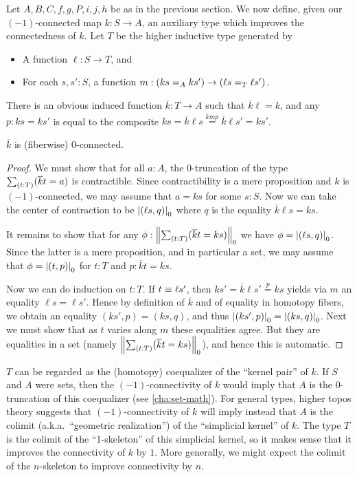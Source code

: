 Let $A,B,C,f,g,P,i,j,h$ be as in the previous section.
We now define, given our $(-1)$-connected map $k:S\to A$, an auxiliary type which improves the connectedness of $k$.
Let $T$ be the higher inductive type generated by
\begin{itemize}
\item A function $\ell:S\to T$, and
\item For each $s,s':S$, a function $m:(\id[A]{ks}{ks'}) \to (\id[T]{\ell s}{\ell s'})$.
\end{itemize}
\newcommand{\kbar}{\overline{k}}
There is an obvious induced function $\kbar:T\to A$ such that $\kbar \ell = k$, and any $p:ks=ks'$ is equal to the composite $ks = \kbar \ell s \overset{\kbar m p}{=} \kbar \ell s' = k s'$.

\begin{lem}\label{thm:kbar}
  $\kbar$ is (fiberwise) 0-connected.
\end{lem}
\begin{proof}
  We must show that for all $a:A$, the 0-truncation of the type $\sm{t:T}(\kbar t = a)$ is contractible.
  Since contractibility is a mere proposition and $k$ is $(-1)$-connected, we may assume that $a=ks$ for some $s:S$.
  Now we can take the center of contraction to be $\tproj0{(\ell s,q)}$ where $q$ is the equality $\kbar\ell s = k s$.

  It remains to show that for any $\phi:\trunc0{\sm{t:T} (\kbar t = ks)}$ we have $\phi = \tproj0{(\ell s,q)}$.
  Since the latter is a mere proposition, and in particular a set, we may assume that $\phi=\tproj0{(t,p)}$ for $t:T$ and $p:\kbar t = ks$.

  Now we can do induction on $t:T$.
  If $t\jdeq\ell s'$, then $ks' = \kbar \ell s' \overset{p}{=} ks$ yields via $m$ an equality $\ell s = \ell s'$.
  Hence by definition of $\kbar$ and of equality in homotopy fibers, we obtain an equality $(ks',p) = (ks,q)$, and thus $\tproj0{(ks',p)} = \tproj0{(ks,q)}$.
  Next we must show that as $t$ varies along $m$ these equalities agree.
  But they are equalities in a set (namely $\trunc0{\sm{t:T} (\kbar t = ks)}$), and hence this is automatic.
\end{proof}

\begin{rmk}
  $T$ can be regarded as the (homotopy) coequalizer of the ``kernel pair'' of $k$.
  If $S$ and $A$ were sets, then the $(-1)$-connectivity of $k$ would imply that $A$ is the $0$-truncation of this coequalizer (see \autoref{cha:set-math}).
  For general types, higher topos theory suggests that $(-1)$-connectivity of $k$ will imply instead that $A$ is the colimit (a.k.a.\ ``geometric realization'') of the ``simplicial kernel'' of $k$.
  The type $T$ is the colimit of the ``1-skeleton'' of this simplicial kernel, so it makes sense that it improves the connectivity of $k$ by $1$.
  More generally, we might expect the colimit of the $n$-skeleton to improve connectivity by $n$.
\end{rmk}

